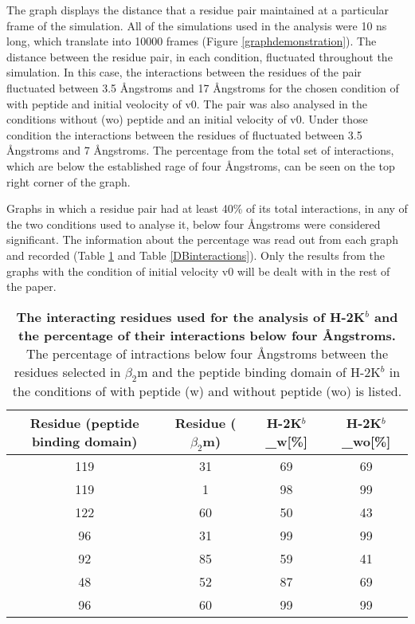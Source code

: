 \documentclass[11pt,twocolumn]{article}
\newcommand{\4}{four {\AA}ngstroms}
\begin{document}
The graph displays the distance that a residue pair maintained at a particular frame of the simulation. All of the simulations used in the analysis were 10 ns long, which translate into 10000 frames (Figure \ref{graphdemonstration}). The distance between the residue pair, in each condition, fluctuated throughout the simulation. In this case, the interactions between the residues of the pair fluctuated between 3.5 {\AA}ngstroms and  17 {\AA}ngstroms for the chosen condition of with peptide and initial veolocity of v0. The pair was also analysed in the conditions without (wo) peptide and an initial velocity of v0. Under those condition the interactions between the residues of  fluctuated between 3.5 {\AA}ngstroms and  7 {\AA}ngstroms.
The percentage from the total set of interactions, which are below the established rage of four {\AA}ngstroms, can be seen on the top right corner of the graph. 

Graphs in which a residue pair had at least 40\% of its total interactions, in any of the two conditions used to analyse it, below four {\AA}ngstroms were considered significant. The information about the percentage was read out from each graph and recorded (Table \ref{KBinteractions} and Table \ref{DBinteractions}). Only the results from the graphs with the condition of initial velocity v0 will be dealt with in the rest of the paper.


\begin{table}[H]
\caption{\textbf{The interacting residues used for the analysis of H-2K$^{b}$ and the percentage of their interactions below four {\AA}ngstroms. } The percentage of intractions below four {\AA}ngstroms between the residues selected in $\beta_{2}$m and the peptide binding domain of H-2K$^{b}$ in the conditions of with peptide (w) and without peptide (wo) is listed.}
\label{KBinteractions}
\centering 
\resizebox{\linewidth}{!} {
\begin{tabular}{|c|c|c|c|}  \hline
Residue (peptide binding domain) &Residue ($\beta_{2}$m)&H-2K$^{b}${\_}w[\%]&H-2K$^{b}${\_}wo[\%]\\ \hline
119&31&69&69\\ \hline
119&1&98&99\\ \hline
122&60&50&43\\ \hline
96&31&99&99\\ \hline
92&85&59&41\\ \hline
48&52&87&69\\ \hline
96&60&99&99\\ \hline
\end{tabular}
}
\end{table}
\end{document}
